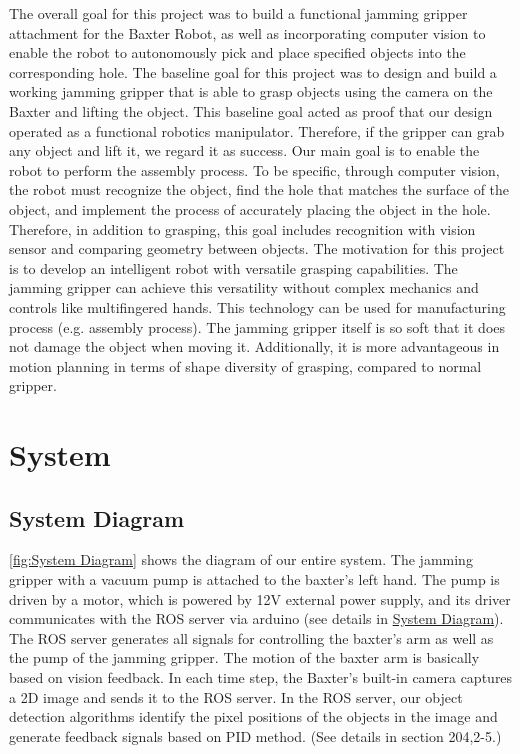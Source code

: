\documentclass[conference,a4paper]{IEEEtran}
\begin{document}
The overall goal for this project was to build a functional jamming gripper attachment for the Baxter Robot, as well as incorporating computer vision to enable the robot to autonomously pick and place specified objects into the corresponding hole. The baseline goal for this project was to design and build a working jamming gripper that is able to grasp objects using the camera on the Baxter and lifting the object. This baseline goal acted as proof that our design operated as a functional robotics manipulator. Therefore, if the gripper can grab any object and lift it, we regard it as success. Our main goal is to enable the robot to perform the assembly process. To be specific, through computer vision, the robot must recognize the object, find the hole that matches the surface of the object, and implement the process of accurately placing the object in the hole. Therefore, in addition to grasping, this goal includes recognition with vision sensor and comparing geometry between objects. The motivation for this project is to develop an intelligent robot with versatile grasping capabilities. The jamming gripper can achieve this versatility without complex mechanics and controls like multifingered hands. This technology can be used for manufacturing process (e.g. assembly process). The jamming gripper itself is so soft that it does not damage the object when moving it. Additionally, it is more advantageous in motion planning in terms of shape diversity of grasping, compared to normal gripper. 

\section{System}

\subsection{System Diagram} \label{System Diagram}

\autoref{fig:System Diagram} shows the diagram of our entire system. The jamming gripper with a vacuum pump is attached to the baxter’s left hand. The pump is driven by a motor, which is powered by 12V external power supply, and its driver communicates with the ROS server via arduino (see details in \hyperref[System Diagram]{System Diagram}). The ROS server generates all signals for controlling the baxter’s arm as well as the pump of the jamming gripper. The motion of the baxter arm is basically based on vision feedback. In each time step, the Baxter’s built-in camera captures a 2D image and sends it to the ROS server. In the ROS server, our object detection algorithms identify the pixel positions of the objects in the image and generate feedback signals based on PID method. (See details in section 204,2-5.)
\end{document}
